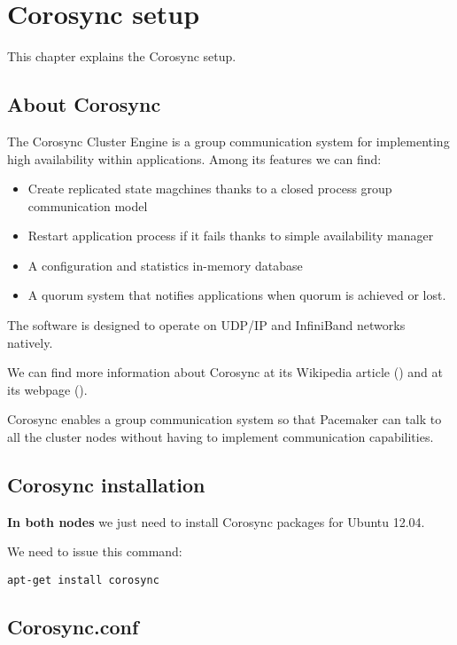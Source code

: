 

\chapter{Corosync setup}
\label{chap:corosync-setup}
This chapter explains the Corosync setup.

\section {About Corosync}
The Corosync Cluster Engine is a group communication system for implementing high availability within applications. Among its features we can find:
\begin{itemize}
  \item Create replicated state magchines thanks to a closed process group communication model
  \item Restart application process if it fails thanks to simple availability manager
  \item A configuration and statistics in-memory database
  \item A quorum system that notifies applications when quorum is achieved or lost.
\end{itemize}


The software is designed to operate on UDP/IP and InfiniBand networks natively.

We can find more information about Corosync at its Wikipedia article (\cite{WikipediaCorosync}) and at its webpage (\cite{CorosyncWebpage}).

Corosync enables a group communication system so that Pacemaker can talk to all the cluster nodes without having to implement communication capabilities.

\section {Corosync installation}
\textbf{In both nodes} we just need to install Corosync packages for Ubuntu 12.04.

We need to issue this command:
\begin{verbatim}
apt-get install corosync
\end{verbatim}


\section {Corosync.conf}

